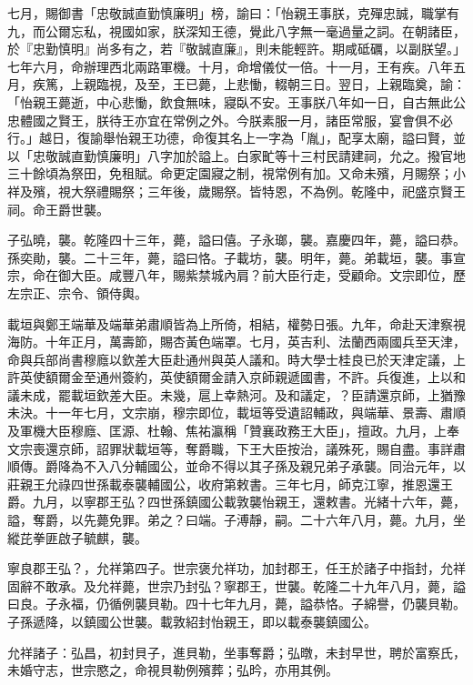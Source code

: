 \begin{pinyinscope}
七月，賜御書「忠敬誠直勤慎廉明」榜，諭曰：「怡親王事朕，克殫忠誠，職掌有九，而公爾忘私，視國如家，朕深知王德，覺此八字無一毫過量之詞。在朝諸臣，於『忠勤慎明』尚多有之，若『敬誠直廉』，則未能輕許。期咸砥礪，以副朕望。」七年六月，命辦理西北兩路軍機。十月，命增儀仗一倍。十一月，王有疾。八年五月，疾篤，上親臨視，及至，王已薨，上悲慟，輟朝三日。翌日，上親臨奠，諭：「怡親王薨逝，中心悲慟，飲食無味，寢臥不安。王事朕八年如一日，自古無此公忠體國之賢王，朕待王亦宜在常例之外。今朕素服一月，諸臣常服，宴會俱不必行。」越日，復諭舉怡親王功德，命復其名上一字為「胤」，配享太廟，謚曰賢，並以「忠敬誠直勤慎廉明」八字加於謚上。白家甿等十三村民請建祠，允之。撥官地三十餘頃為祭田，免租賦。命更定園寢之制，視常例有加。又命未殯，月賜祭；小祥及殯，視大祭禮賜祭；三年後，歲賜祭。皆特恩，不為例。乾隆中，祀盛京賢王祠。命王爵世襲。

子弘曉，襲。乾隆四十三年，薨，謚曰僖。子永瑯，襲。嘉慶四年，薨，謚曰恭。孫奕勛，襲。二十三年，薨，謚曰恪。子載坊，襲。明年，薨。弟載垣，襲。事宣宗，命在御大臣。咸豐八年，賜紫禁城內肩？前大臣行走，受顧命。文宗即位，歷左宗正、宗令、領侍輿。

載垣與鄭王端華及端華弟肅順皆為上所倚，相結，權勢日張。九年，命赴天津察視海防。十年正月，萬壽節，賜杏黃色端罩。七月，英吉利、法蘭西兩國兵至天津，命與兵部尚書穆廕以欽差大臣赴通州與英人議和。時大學士桂良已於天津定議，上許英使額爾金至通州簽約，英使額爾金請入京師親遞國書，不許。兵復進，上以和議未成，罷載垣欽差大臣。未幾，扈上幸熱河。及和議定，？臣請還京師，上猶豫未決。十一年七月，文宗崩，穆宗即位，載垣等受遺詔輔政，與端華、景壽、肅順及軍機大臣穆廕、匡源、杜翰、焦祐瀛稱「贊襄政務王大臣」，擅政。九月，上奉文宗喪還京師，詔罪狀載垣等，奪爵職，下王大臣按治，議殊死，賜自盡。事詳肅順傳。爵降為不入八分輔國公，並命不得以其子孫及親兄弟子承襲。同治元年，以莊親王允祿四世孫載泰襲輔國公，收府第敕書。三年七月，師克江寧，推恩還王爵。九月，以寧郡王弘？四世孫鎮國公載敦襲怡親王，還敕書。光緒十六年，薨，謚，奪爵，以先薨免罪。弟之？曰端。子溥靜，嗣。二十六年八月，薨。九月，坐縱芘拳匪啟子毓麒，襲。

寧良郡王弘？，允祥第四子。世宗褒允祥功，加封郡王，任王於諸子中指封，允祥固辭不敢承。及允祥薨，世宗乃封弘？寧郡王，世襲。乾隆二十九年八月，薨，謚曰良。子永福，仍循例襲貝勒。四十七年九月，薨，謚恭恪。子綿譽，仍襲貝勒。子孫遞降，以鎮國公世襲。載敦紹封怡親王，即以載泰襲鎮國公。

允祥諸子：弘昌，初封貝子，進貝勒，坐事奪爵；弘暾，未封早世，聘於富察氏，未婚守志，世宗愍之，命視貝勒例殯葬；弘昑，亦用其例。


\end{pinyinscope}
